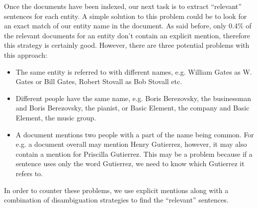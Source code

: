 Once the documents have been indexed, our next task is to extract “relevant” sentences for each entity. A simple solution to this problem could be to look for an exact match of our entity name in the document. As said before, only 0.4\% of the relevant documents for an entity don’t contain an explicit mention, therefore this strategy is certainly good. However, there are three potential problems with this approach:
\begin{itemize}
\item The same entity is referred to with different names, e.g. William Gates as W. Gates or Bill Gates, Robert Stovall as Bob Stovall etc.
\item Different people have the same name, e.g. Boris Berezovsky, the businessman and Boris Berezovsky, the pianist, or Basic Element, the company and Basic Element, the music group.
\item A document mentions two people with a part of the name being common. For e.g. a document overall may mention Henry Gutierrez, however, it may also contain a mention for Priscilla Gutierrez. This may be a problem because if a sentence uses only the word Gutierrez, we need to know which Gutierrez it refers to.
\end{itemize}
In order to counter these problems, we use explicit mentions along with a combination of disambiguation strategies to find the “relevant” sentences. 

